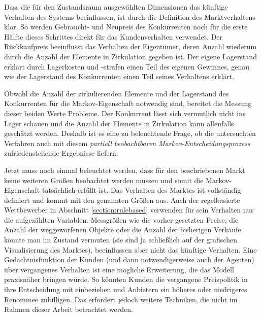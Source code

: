 Dass die für den Zustandsraum ausgewählten Dimensionen das künftige Verhalten des Systems beeinflussen, ist durch die Definition des Marktverhaltens klar.
So werden Gebraucht- und Neupreis des Konkurrenten noch für die erste Hälfte dieses Schrittes direkt für das Kundenverhalten verwendet.
Der Rückkaufpreis beeinflusst das Verhalten der Eigentümer, deren Anzahl wiederum durch die Anzahl der Elemente in Zirkulation gegeben ist.
Der eigene Lagerstand erklärt durch Lagerkosten und -strafen einen Teil des eigenen Gewinnes, genau wie der Lagerstand des Konkurrenten einen Teil seines Verhaltens erklärt.

Obwohl die Anzahl der zirkulierenden Elemente und der Lagerstand des Konkurrenten für die Markov-Eigenschaft notwendig sind, bereitet die Messung dieser beiden Werte Probleme.
Der Konkurrent lässt sich vermutlich nicht ins Lager schauen und die Anzahl der Elemente in Zirkulation kann allenfalls geschätzt werden.
Deshalb ist es eine zu beleuchtende Frage, ob die untersuchten Verfahren auch mit diesem \textit{partiell beobachtbaren Markov-Entscheidungsprozess} zufriedenstellende Ergebnisse liefern.

Jetzt muss noch einmal beleuchtet werden, dass für den beschriebenen Markt keine weiteren Größen beobachtet werden müssen und somit die Markov-Eigenschaft tatsächlich erfüllt ist.
Das Verhalten des Marktes ist vollständig definiert und kommt mit den genannten Größen aus.
Auch der regelbasierte Wettbewerber in Abschnitt \ref{section:rulebased} verwenden für sein Verhalten nur die aufgezählten Variablen.
Messgrößen wie die vorher gesetzten Preise, die Anzahl der weggeworfenen Objekte oder die Anzahl der bisherigen Verkäufe könnte man im Zustand vermuten (sie sind ja schließlich auf der grafischen Visualisierung des Marktes), beeinflussen aber nicht das künftige Verhalten.
Eine Gedächtnisfunktion der Kunden (und dann notwendigerweise auch der Agenten) über vergangenes Verhalten ist eine mögliche Erweiterung, die das Modell praxisnäher bringen würde.
So könnten Kunden die vergangene Preispolitik in ihre Entscheidung mit einbeziehen und Anbietern ein höheres oder niedrigeres Renommee zubilligen.
Das erfordert jedoch weitere Techniken, die nicht im Rahmen dieser Arbeit betrachtet werden.

